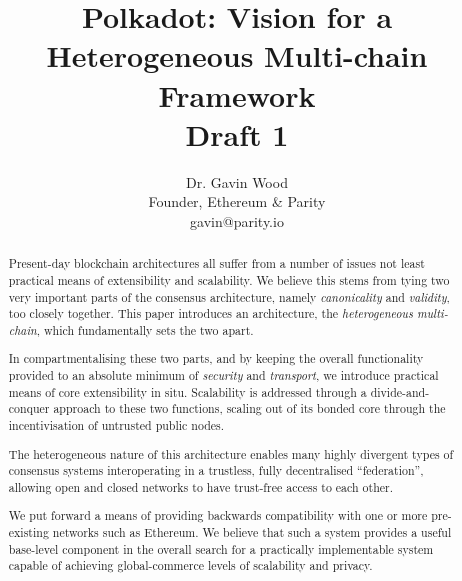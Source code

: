 \documentclass[9pt,oneside]{amsart}
\title{Polkadot: Vision for a Heterogeneous Multi-chain Framework \\ {\smaller \textbf{Draft 1}}}
\author{
  Dr. Gavin Wood\\
  Founder, Ethereum \& Parity\\
   gavin@parity.io }
\begin{document}
\begin{abstract}
Present-day blockchain architectures all suffer from a number of issues not least practical means of extensibility and scalability. We believe this stems from tying two very important parts of the consensus architecture, namely \textit{canonicality} and \textit{validity}, too closely together. This paper introduces an architecture, the \textit{heterogeneous multi-chain}, which fundamentally sets the two apart.

In compartmentalising these two parts, and by keeping the overall functionality provided to an absolute minimum of \textit{security} and \textit{transport}, we introduce practical means of core extensibility in situ. Scalability is addressed through a divide-and-conquer approach to these two functions, scaling out of its bonded core through the incentivisation of untrusted public nodes.

 The heterogeneous nature of this architecture enables many highly divergent types of consensus systems interoperating in a trustless, fully decentralised ``federation'', allowing open and closed networks to have trust-free access to each other.

We put forward a means of providing backwards compatibility with one or more pre-existing networks such as Ethereum. We believe that such a system provides a useful base-level component in the overall search for a practically implementable system capable of achieving global-commerce levels of scalability and privacy.
\end{abstract}

\maketitle
\end{document}
